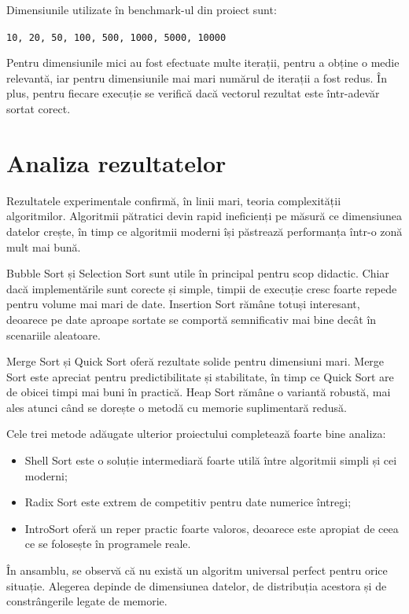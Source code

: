 \documentclass[12pt,a4paper]{article}
\begin{document}
Dimensiunile utilizate în benchmark-ul din proiect sunt:

\begin{center}
\texttt{10, 20, 50, 100, 500, 1000, 5000, 10000}
\end{center}

Pentru dimensiunile mici au fost efectuate multe iterații, pentru a obține o medie relevantă, iar pentru dimensiunile mai mari numărul de iterații a fost redus. În plus, pentru fiecare execuție se verifică dacă vectorul rezultat este într-adevăr sortat corect.

\section{Analiza rezultatelor}

Rezultatele experimentale confirmă, în linii mari, teoria complexității algoritmilor. Algoritmii pătratici devin rapid ineficienți pe măsură ce dimensiunea datelor crește, în timp ce algoritmii moderni își păstrează performanța într-o zonă mult mai bună.

Bubble Sort și Selection Sort sunt utile în principal pentru scop didactic. Chiar dacă implementările sunt corecte și simple, timpii de execuție cresc foarte repede pentru volume mai mari de date. Insertion Sort rămâne totuși interesant, deoarece pe date aproape sortate se comportă semnificativ mai bine decât în scenariile aleatoare.

Merge Sort și Quick Sort oferă rezultate solide pentru dimensiuni mari. Merge Sort este apreciat pentru predictibilitate și stabilitate, în timp ce Quick Sort are de obicei timpi mai buni în practică. Heap Sort rămâne o variantă robustă, mai ales atunci când se dorește o metodă cu memorie suplimentară redusă.

Cele trei metode adăugate ulterior proiectului completează foarte bine analiza:

\begin{itemize}
    \item Shell Sort este o soluție intermediară foarte utilă între algoritmii simpli și cei moderni;
    \item Radix Sort este extrem de competitiv pentru date numerice întregi;
    \item IntroSort oferă un reper practic foarte valoros, deoarece este apropiat de ceea ce se folosește în programele reale.
\end{itemize}

În ansamblu, se observă că nu există un algoritm universal perfect pentru orice situație. Alegerea depinde de dimensiunea datelor, de distribuția acestora și de constrângerile legate de memorie.
\end{document}
